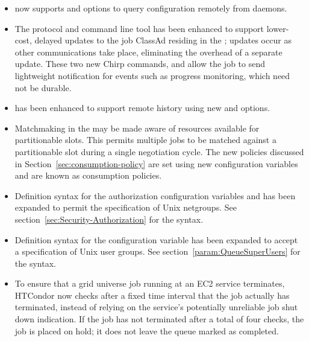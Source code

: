 \begin{itemize}

\item {} now supports  and 
options to query configuration remotely from daemons.

\item The  protocol and command line tool has been
enhanced to support lower-cost, delayed updates to the job
ClassAd residing in the ; updates occur as other communications
take place, eliminating the overhead of a separate update.
These two new Chirp commands,
 and  allow the job
to send lightweight notification for events such as progress
monitoring, which need not be durable.

\item {} has been enhanced to support
remote history using new  and  options.

\item Matchmaking in the  may be made aware of resources
available for partitionable slots.
This permits multiple jobs to be matched against a partitionable slot
during a single negotiation cycle.
The new policies discussed in Section~\ref{sec:consumption-policy}
are set using new configuration variables and are known as consumption policies.

\item Definition syntax for the authorization configuration variables
 and  has been expanded to permit
the specification of Unix netgroups.
See section~\ref{sec:Security-Authorization} for the syntax.

\item Definition syntax for the configuration variable
 has been expanded to accept a specification
of Unix user groups.
See section~\ref{param:QueueSuperUsers} for the syntax.

\item To ensure that a grid universe job running at an EC2 service
terminates, 
HTCondor now checks after a fixed time interval 
that the job actually has terminated,
instead of relying on the service's potentially unreliable 
job shut down indication.
If the job has not terminated after a total of four checks,
the job is placed on hold; it does not leave the queue marked as completed.


\end{itemize}
